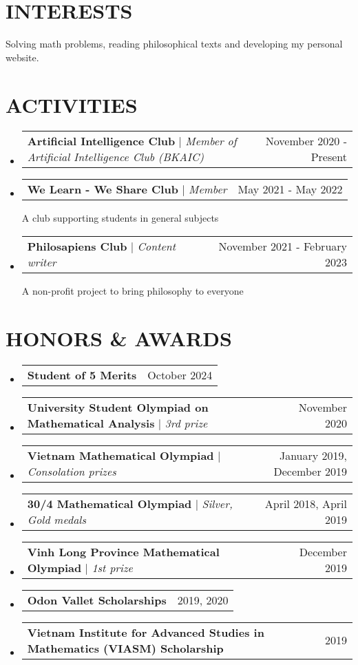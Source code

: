 \documentclass[letterpaper,11pt]{article}
\makeatletter
\newcommand{\resumeProjectHeading}[2]{
    \item
    \begin{tabular*}{0.97\textwidth}{l@{\extracolsep{\fill}}r}
      \small#1 & #2 \\
    \end{tabular*}\vspace{-7pt}
}
\newcommand{\resumeSubHeadingListStart}{\begin{itemize}[leftmargin=0.15in, label={}]}
\newcommand{\resumeSubHeadingListEnd}{\end{itemize}}
\makeatother
\begin{document}
\section{\textbf{INTERESTS}}
\indent\indent Solving math problems, reading philosophical texts and developing my personal website.

\section{\textbf{ACTIVITIES}}
\resumeSubHeadingListStart
\resumeProjectHeading
{\textbf{Artificial Intelligence Club} $|$ \footnotesize\emph{Member of Artificial Intelligence Club (BKAIC)}}{November 2020 - Present}
\resumeProjectHeading
{\textbf{We Learn - We Share Club}\vspace{8pt} $|$ \footnotesize\emph{Member}}{May 2021 - May 2022}
\small{A club supporting students in general subjects}
\resumeProjectHeading
{\textbf{Philosapiens Club}\vspace{8pt} $|$ \footnotesize\emph{Content writer}}{November 2021 - February 2023}
\small{A non-profit project to bring philosophy to everyone}

\resumeSubHeadingListEnd

\section{\textbf{HONORS \& AWARDS}}
\resumeSubHeadingListStart
\resumeProjectHeading
{\textbf{Student of 5 Merits} \vspace{8pt} \footnotesize\emph{}}{October 2024}
\resumeProjectHeading
{\textbf{University Student Olympiad on Mathematical Analysis} \vspace{8pt} $|$ \footnotesize\emph{3rd prize}}{November 2020}
\resumeProjectHeading
{\textbf{Vietnam Mathematical Olympiad}\vspace{8pt} $|$ \footnotesize\emph{Consolation prizes}}{January 2019, December 2019}
\resumeProjectHeading
{\textbf{30/4 Mathematical Olympiad }\vspace{8pt} $|$ \footnotesize\emph{Silver, Gold medals}}{April 2018, April 2019}
\resumeProjectHeading
{\textbf{Vinh Long Province Mathematical Olympiad }\vspace{8pt} $|$ \footnotesize\emph{1st prize}}{December 2019}
\resumeProjectHeading
{\textbf{Odon Vallet Scholarships }}{2019, 2020}
\resumeProjectHeading
{\textbf{Vietnam Institute for Advanced Studies in Mathematics (VIASM) Scholarship}}{2019}
\resumeSubHeadingListEnd
\end{document}
